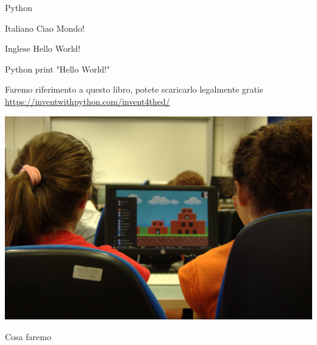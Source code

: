 
\begin{frame}{Python}
    \begin{block}{Italiano}
        Ciao Mondo!
    \end{block}

    \begin{block}{Inglese}
        Hello World!
    \end{block}

    \begin{block}{Python}
        print "Hello World!"
    \end{block}
    
    \small{Faremo riferimento a questo libro, potete scaricarlo legalmente gratis
    \url{https://inventwithpython.com/invent4thed/}}

\end{frame}

{\includegraphics[width=\paperwidth,height=\paperheight]{images/summer_camp_2018_10.jpg}}
\begin{frame}{Cosa faremo}
\end{frame}

